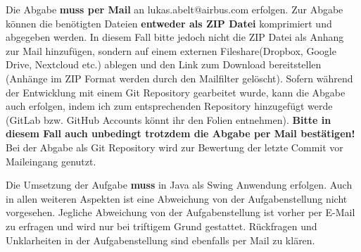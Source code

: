 \documentclass[a4paper,
			   fontsize=12pt]{article}
\begin{document}
Die Abgabe \textbf{muss per Mail} an lukas.abelt@airbus.com erfolgen. Zur Abgabe können die benötigten Dateien \textbf{entweder als ZIP Datei} komprimiert und abgegeben werden. In diesem Fall bitte jedoch nicht die ZIP Datei als Anhang zur Mail hinzufügen,
sondern auf einem externen Fileshare(Dropbox, Google Drive, Nextcloud etc.) ablegen und den Link zum Download bereitstellen (Anhänge im ZIP Format werden durch den Mailfilter gelöscht). Sofern während der Entwicklung mit einem Git Repository gearbeitet wurde,
kann die Abgabe auch erfolgen, indem ich zum entsprechenden Repository hinzugefügt werde (GitLab bzw. GitHub Accounts könnt ihr den Folien entnehmen). \textbf{Bitte in diesem Fall auch unbedingt trotzdem die Abgabe per Mail bestätigen!} Bei der Abgabe als
Git Repository wird zur Bewertung der letzte Commit vor Maileingang genutzt.

Die Umsetzung der Aufgabe \textbf{muss} in Java als Swing Anwendung erfolgen. Auch in allen weiteren Aspekten ist eine Abweichung von der Aufgabenstellung nicht vorgesehen. Jegliche Abweichung von der Aufgabenstellung ist vorher
per E-Mail zu erfragen und wird nur bei triftigem Grund gestattet. Rückfragen und Unklarheiten in der Aufgabenstellung sind ebenfalls per Mail zu klären.
\end{document}
